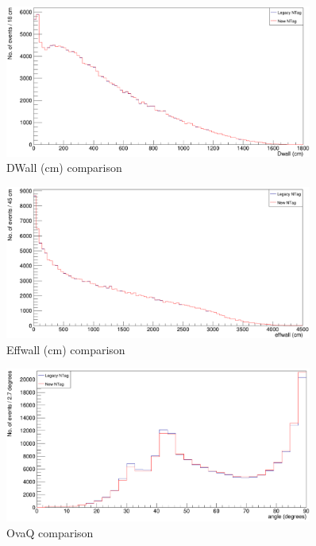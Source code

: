 \begin{figure}
    \centering
    \includegraphics[width=0.9\textwidth]{Figures/dwall_recon_compare.PNG}
    \caption{DWall (cm) comparison}
    \label{fig:dwall_recon_compare}

\end{figure}

\begin{figure}
    \centering
    \includegraphics[width=0.9\textwidth]{Figures/effwall_recon_compare.PNG}
    \caption{Effwall (cm) comparison}
    \label{fig:effwall_recon_compare}

\end{figure}

\begin{figure}
    \centering
    \includegraphics[width=0.9\textwidth]{Figures/angle_recon_compare.PNG}
    \caption{OvaQ comparison}
    \label{fig:angle_recon_compare}

\end{figure}


